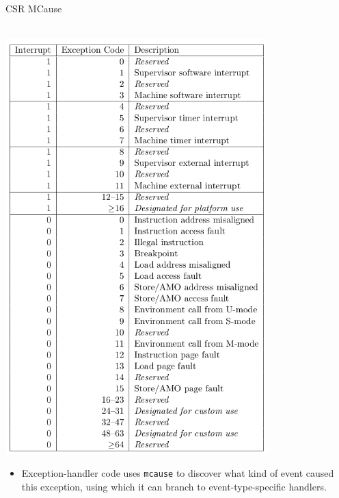 \documentclass{article}
\newcommand{\hm}{\hspace*{1em}}
\newcommand{\hmm}{\hspace*{2em}}
\newcommand{\hmmmm}{\hspace*{4em}}
\begin{document}
\clearpage


\begin{center}
  {\Huge
    CSR MCause}
\end{center}

\vspace*{0.2in}

\hmmmm
\begin{minipage}[t]{4in}
  \hmm \\
  \includegraphics[width=4in]{Figs/CSR_MCause.png}
\end{minipage}
\hm
\begin{minipage}[t]{4.5in}
  \hmm

  \vspace{1in}

  \begin{itemize}\Large
  \item Exception-handler code uses {\tt mcause} to discover what kind
    of event caused this exception, using which it can branch to
    event-type-specific handlers.
  \end{itemize}
\end{minipage}
\end{document}
